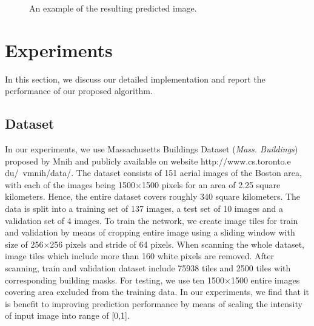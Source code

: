 \documentclass[runningheads]{llncs}
\begin{document}
\begin{figure}
\centering
{}	
\caption{ An example of the resulting predicted image.}
\label{fig:AGroupOfExamples}
\end{figure}


\section{Experiments}
\label{section:experiments}
In this section, we discuss our detailed implementation and report the performance of our proposed algorithm.

\subsection{Dataset}
   In our experiments, we use Massachusetts Buildings Dataset (\textit{Mass. Buildings}) proposed by Mnih \cite{Mnih2013Machine} and publicly available on website http://www.cs.toronto.e
du/~vmnih/data/. The dataset consists of 151 aerial images of the Boston area, with each of the images being 1500$\times$1500 pixels for an area of 2.25 square kilometers. Hence, the entire dataset covers roughly 340 square kilometers. The data is split into a training set of 137 images, a test set of 10 images and a validation set of 4 images. To train the network, we create image tiles for train and validation by means of cropping entire image using a sliding window with size of 256$\times$256 pixels and stride of 64 pixels. When scanning the whole dataset, image tiles which include more than 160 white pixels are removed. After scanning, train and validation dataset include 75938 tiles and 2500 tiles with corresponding building masks. For testing, we use ten 1500$\times$1500 entire images covering area excluded from the training data. In our experiments, we find that it is benefit to improving prediction performance by means of scaling the intensity of input image into range of [0,1]. 
\end{document}
